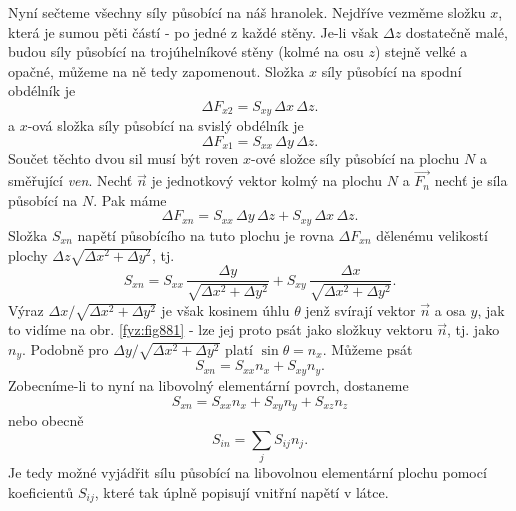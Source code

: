 {    Nyní sečteme všechny síly působící na náš hranolek. Nejdříve vezměme složku \(x\), která je
    sumou pěti částí - po jedné z každé stěny. Je-li však \(Δz\) dostatečně malé, budou síly
    působící na trojúhelníkové stěny (kolmé na osu \(z\)) stejně velké a opačné, můžeme na ně tedy
    zapomenout. Složka \(x\) síly působící na spodní obdélník je
    \begin{equation*}
      \Delta F_{x2}=S_{xy}\,\Delta x\,\Delta z.
    \end{equation*}
    a \(x\)-ová složka síly působící na svislý obdélník je
    \begin{equation*}
      \Delta F_{x1}=S_{xx}\,\Delta y\,\Delta z.
    \end{equation*}
    Součet těchto dvou sil musí být roven \(x\)-ové složce síly působící na plochu \(N\) a směřující
    \emph{ven}. Nechť \(\vec{n}\) je jednotkový vektor kolmý na plochu \(N\) a \(\vec{F_n}\) nechť
    je síla působící na \(N\). Pak máme
    \begin{equation*}
      \Delta F_{xn}=S_{xx}\,\Delta y\,\Delta z+S_{xy}\,\Delta x\,\Delta z.
    \end{equation*}
    Složka \(S_{xn}\) napětí působícího na tuto plochu je rovna \(\Delta F_{xn}\) dělenému velikostí
    plochy \(\Delta z\sqrt{\Delta x^2+\Delta y^2}\), tj.
    \begin{equation*}
      S_{xn}=S_{xx}\,\frac{\Delta y}{\sqrt{\Delta x^2+\Delta y^2}}+
      S_{xy}\,\frac{\Delta x}{\sqrt{\Delta x^2+\Delta y^2}}.
    \end{equation*}
    Výraz \(\Delta x/\sqrt{\Delta x^2+\Delta y^2}\) je však kosinem úhlu \(\theta\) jenž svírají
    vektor \(\vec{n}\) a osa \(y\), jak to vidíme na obr. \ref{fyz:fig881} - lze jej proto psát jako
    složkuy vektoru \(\vec{n}\), tj. jako \(n_y\). Podobně pro \(\Delta y/\sqrt{\Delta x^2+\Delta
    y^2}\) platí \(\sin\theta=n_x\). Můžeme psát
    \begin{equation*}
      S_{xn}=S_{xx}n_x+S_{xy}n_y.
    \end{equation*}
    Zobecníme-li to nyní na libovolný elementární povrch, dostaneme
    \begin{equation*}
      S_{xn}=S_{xx}n_x+S_{xy}n_y+S_{xz}n_z
    \end{equation*}
    nebo obecně
    \begin{equation}\label{fyz:eq952}
      S_{in}=\sum_jS_{ij}n_j.
    \end{equation} 
    Je tedy možné vyjádřit sílu působící na libovolnou elementární plochu pomocí koeficientů
    \(S_{ij}\), které tak úplně popisují vnitřní napětí v látce.

}
